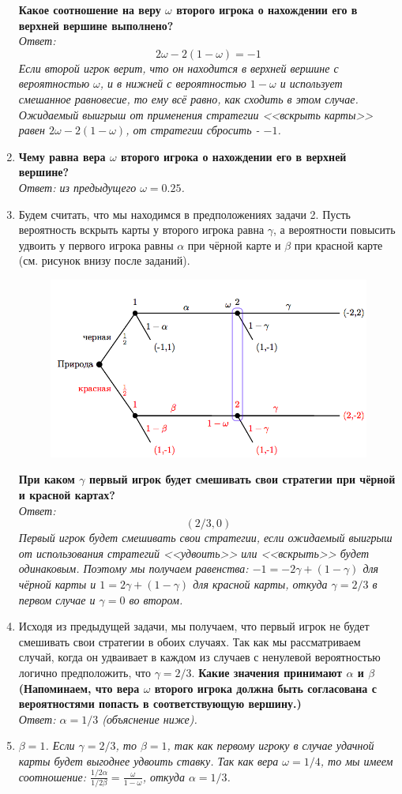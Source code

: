 \documentclass[a4paper,12pt]{article}
\begin{document}
\begin{enumerate}
	\textbf{Какое соотношение на веру $\omega$ второго игрока о нахождении его в верхней вершине выполнено?}\\
	\textit{Ответ: $$2\omega-2(1-\omega) = -1$$ Если второй игрок верит, что он находится в верхней вершине с вероятностью $\omega$, и в нижней с вероятностью $1-\omega$ и использует смешанное равновесие, то ему всё равно, как сходить в этом случае. Ожидаемый выигрыш от применения стратегии <<вскрыть карты>> равен $2\omega-2(1-\omega)$, от стратегии сбросить - $-1$.}
	\item \textbf{Чему равна вера $\omega$ второго игрока о нахождении его в верхней вершине?}\\
	\textit{Ответ: из предыдущего $\omega = 0.25$.}
	\item Будем считать, что мы находимся в предположениях задачи 2. Пусть вероятность вскрыть карты у второго игрока равна $\gamma$, а вероятности повысить удвоить у первого игрока равны $\alpha$ при чёрной карте и $\beta$ при красной карте (см. рисунок внизу после заданий).
	\begin{figure}[h!]
		\centering
		\includegraphics[width=0.7\linewidth]{wVBHNifgEeak5wpS_JmWWw_6fbbaac5a5e6813956346cf1ffe95c35_w06_test5}
		\caption{}
		\label{fig:wvbhnifgeeak5wpsjmwww6fbbaac5a5e6813956346cf1ffe95c35w06test5}
	\end{figure}

	\textbf{При каком $\gamma$ первый игрок будет смешивать свои стратегии при чёрной и красной картах?}\\
	\textit{Ответ: $$(2/3, 0)$$ Первый игрок будет смешивать свои стратегии, если ожидаемый выигрыш от использования стратегий <<удвоить>> или <<вскрыть>> будет одинаковым. Поэтому мы получаем равенства: $-1=-2\gamma+(1-\gamma)$ для чёрной карты и $1=2\gamma+(1-\gamma)$ для красной карты, откуда $\gamma=2/3$ в первом случае и $\gamma=0$ во втором.}
	\item Исходя из предыдущей задачи, мы получаем, что первый игрок не будет смешивать свои стратегии в обоих случаях. Так как мы рассматриваем случай, когда он удваивает в каждом из случаев с ненулевой вероятностью логично предположить, что $\gamma=2/3$. \textbf{Какие значения принимают $\alpha$ и $\beta$ (Напоминаем, что вера $\omega$ второго игрока должна быть согласована с вероятностями попасть в соответствующую вершину.)}\\
	\textit{Ответ: $\alpha = 1/3$ (объяснение ниже). }
	\item \textit{$\beta = 1$. Если $\gamma=2/3$, то $\beta = 1$, так как первому игроку в случае удачной карты будет выгоднее удвоить ставку. Так как вера $\omega = 1/4$, то мы имеем соотношение: $\frac{1/2\alpha}{1/2\beta} = \frac{\omega}{1-\omega}$, откуда $\alpha = 1/3$.}
\end{enumerate}
\end{document}
